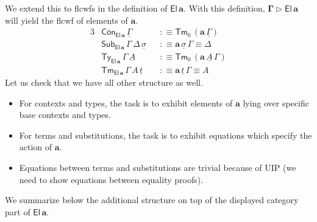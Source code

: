 \documentclass[12pt,a4paper,twoside,openany]{book}
\theoremstyle{remark}
\theoremstyle{definition}
\theoremstyle{theorem}
\newcommand{\bs}[1]{\boldsymbol{#1}}
\newcommand{\Con}{\mathsf{Con}}
\newcommand{\Sub}{\mathsf{Sub}}
\newcommand{\Tm}{\mathsf{Tm}}
\newcommand{\Ty}{\mathsf{Ty}}
\newcommand{\El}{\mathsf{El}}
\newcommand{\ext}{\triangleright}
\newcommand{\ba}{\bs{a}}
\newcommand{\ul}[1]{\underline{#1}}
\newcommand{\ulGamma}{\ul{\Gamma}}
\newcommand{\ulsigma}{\ul{\sigma}}
\newcommand{\ult}{\ul{t}}
\newcommand{\ulA}{\ul{A}}
\newcommand{\defn}{:\equiv}
\begin{document}
We extend this to flcwfs in the definition of $\bs{\El\,a}$. With this
definition, $\bs{\Gamma \ext \El\,a}$ will yield the flcwf of elements of $\ba$.
\begin{alignat*}{3}
  &\Con_{\bs{\El\,a}}\,\ulGamma &&\defn \Tm_0\,(\ba\,\ulGamma) \\
  &\Sub_{\bs{\El\,a}}\,\Gamma\,\Delta\,\ulsigma &&\defn \ba\,\ulsigma\,\Gamma \equiv \Delta \\
  &\Ty_{\bs{\El\,a}}\,\Gamma\,\ulA &&\defn \Tm_0\,(\ba\,\ulA\,\Gamma)\\
  &\Tm_{\bs{\El\,a}}\,\Gamma\,A\,\ult &&\defn \ba\,\ult\,\Gamma \equiv A
\end{alignat*}
Let us check that we have all other structure as well.
\begin{itemize}
  \item For contexts and types, the task is to exhibit elements of $\ba$ lying over
        specific base contexts and types.
  \item For terms and substitutions, the task is to exhibit equations which
    specify the action of $\ba$.
  \item Equations between terms and substitutions are trivial because of UIP (we need
    to show equations between equality proofs).
\end{itemize}
We summarize below the additional structure on top of the displayed category
part of $\bs{\El\,a}$.
\end{document}
